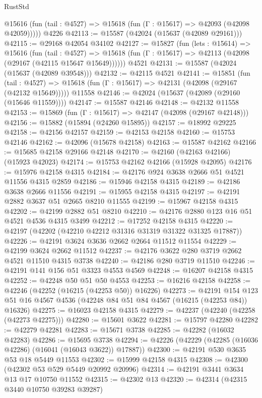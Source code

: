 \begin{lexlean}{RustStd}
\begin{coremodule}
      @15616 (fun (tail : @4527) => @15618 (fun (Γ : @15617) => @42093 (@42098 @42059)))))
    @4226
@42113 := @15587 (@42024 (@15637 (@42089 @29161)))
@42115 := @29168 @42054 @34102
@42127 := @15827
    (fun (lets : @15614) =>
    @15616
      (fun (tail : @4527) =>
      @15618 (fun (Γ : @15617) => @42113 (@42098 (@29167 (@42115 @15647 @15649))))))
    @4521
@42131 := @15587 (@42024 (@15637 (@42089 @39548)))
@42132 := @42115 @4521
@42141 := @15851
    (fun (tail : @4527) => @15618 (fun (Γ : @15617) => @42131 (@42098 (@29167 (@42132 @15649)))))
    @11558
@42146 := @42024 (@15637 (@42089 (@29160 (@15646 @11559))))
@42147 := @15587 @42146
@42148 := @42132 @11558
@42153 := @15869 (fun (Γ : @15617) => @42147 (@42098 (@29167 @42148)))
@42156 := @15882 (@15894 (@24260 @15895))
@42157 := @18992 @29225
@42158 := @42156 @42157
@42159 := @42153 @42158
@42160 := @15753 @42146
@42162 := @42096 (@15678 @42158)
@42163 := @15587 @42162
@42166 := @15685 @42158 @29166 @42148
@42170 := @42160 (@42163 @42166) (@15923 @42023)
@42174 := @15753 @42162 @42166 (@15928 @42095)
@42176 := @15976 @42158 @4315
@42184 := @42176 @924 @3638 @2666 @51 @4521 @11556 @4315 @2859
@42186 := @15946 @42158 @4315
@42189 := @42186 @3638 @2666 @11556
@42191 := @15955 @42158 @4315
@42197 := @42191 @2882 @3637 @51 @2665 @8210 @11555
@42199 := @15967 @42158 @4315
@42202 := @42199 @2882 @51 @8210
@42210 := @42176 @2880 @123 @16 @51 @4521 @4536 @4315 @3499
@42212 := @17252 @42158 @4315
@42220 := @42197 (@42202 (@42210 @42212 @31316 @31319 @31322 @31325 @17887))
@42226 := @42191 @3624 @3636 @2662 @2664 @11512 @11554
@42229 := @42199 @3624 @2662 @11512
@42237 := @42176 @3622 @280 @3719 @2662 @4521 @11510 @4315 @3738
@42240 := @42186 @280 @3719 @11510
@42246 := @42191 @141 @156 @51 @3323 @4553 @4569
@42248 := @16207 @42158 @4315
@42252 := @42248 @50 @51 @50 @4553
@42253 := @16216 @42158
@42258 := @42246 (@42252 (@16215 (@42253 @50)) @16226)
@42273 := @42191
    @154
    @123
    @51
    @16
    @4567
    @4536
    (@42248 @84 @51 @84 @4567 (@16215 (@42253 @84)) @16326)
@42275 := @16023 @42158 @4315
@42279 := @42237 (@42240 (@42258 (@42273 @42275)))
@42280 := @15601 @3622
@42281 := @15797 @42280
@42282 := @42279 @42281
@42283 := @15671 @3738
@42285 := @42282 (@16032 @42283)
@42286 := @15695 @3738
@42294 := @42226 (@42229 (@42285 (@16036 @42286) (@16041 (@16043 @3622)) @17887))
@42300 := @42191 @530 @3635 @53 @18 @5449 @11553
@42302 := @15999 @42158 @4315
@42308 := @42300 (@42302 @53 @529 @5449 @20992 @20996)
@42314 := @42191 @3441 @3634 @13 @17 @10750 @11552
@42315 := @42302 @13
@42320 := @42314 (@42315 @3440 @10750 @39283 @39287)

\end{coremodule}
\end{lexlean}
